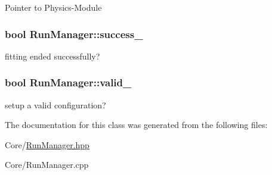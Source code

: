 Pointer to Physics-\/\-Module \hypertarget{class_run_manager_a5d27906c077b0e898abd56722a593886}{
\subsubsection[{success\-\_\-}]{\setlength{\rightskip}{0pt plus 5cm}bool Run\-Manager\-::success\-\_\-\hspace{0.3cm}{\ttfamily [protected]}}}\label{class_run_manager_a5d27906c077b0e898abd56722a593886}
fitting ended successfully? \hypertarget{class_run_manager_a0680769857728209363f2404a50a9f50}{
\subsubsection[{valid\-\_\-}]{\setlength{\rightskip}{0pt plus 5cm}bool Run\-Manager\-::valid\-\_\-\hspace{0.3cm}{\ttfamily [protected]}}}\label{class_run_manager_a0680769857728209363f2404a50a9f50}
setup a valid configuration? 

The documentation for this class was generated from the following files\-:\begin{DoxyCompactItemize}
\item 
Core/\hyperlink{_run_manager_8hpp}{Run\-Manager.\-hpp}\item 
Core/Run\-Manager.\-cpp\end{DoxyCompactItemize}
